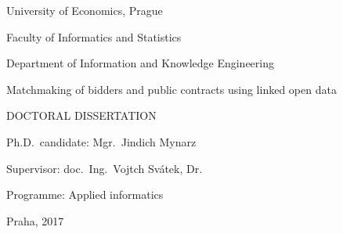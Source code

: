 \begin{titlepage}
    \begin{center}
        \begingroup 
        \sffamily

        \large
        University of Economics, Prague
        
        \small
        Faculty of Informatics and Statistics
        
        Department of Information and Knowledge Engineering

        \vfill

        \LARGE
        Matchmaking of bidders and public contracts using linked open data
        
        \normalsize
        \uppercase{Doctoral dissertation}

        \vspace{4cm}
       
        \small
        Ph.D.~candidate: Mgr.~Jind\rhacek{}ich Mynarz

        Supervisor: doc.~Ing.~Vojt\ehacek{}ch Svátek, Dr.

        Programme: Applied informatics

        \vfill
        
        Praha, 2017

        \endgroup
    \end{center}
\end{titlepage}
